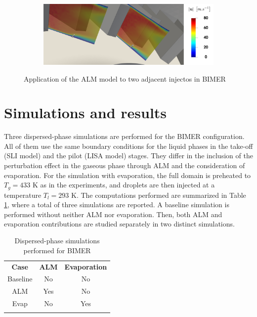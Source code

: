 \begin{figure}[ht]
\centering
\begin{subfigure}[b]{1.0\textwidth}
	\centering
   \includegraphics[scale=0.18]{./part3_applications/figures_ch9_lagrangian/turbulent_structures/ALM_revolution}
\end{subfigure}
   \caption{Application of the ALM model to two adjacent injectos in BIMER}
\label{fig:BIMER_ALM_revolution}
\end{figure}

\section{Simulations and results}

Three dispersed-phase simulations are performed for the BIMER configuration. All of them use the same boundary conditions for the liquid phases in the take-off (SLI model) and the pilot (LISA model) stages. They differ in the inclusion of the perturbation effect in the gaseous phase through ALM and the consideration of evaporation. For the simulation with evaporation, the full domain is preheated to $T_g = 433$ K as in the experiments, and droplets are then injected at a temperature $T_l = 293 $ K.  The computations performed are summarized in Table \ref{tab:BIMER_dispersed_phase_simulations_performed}, where a total of three simulations are reported. A baseline simulation is performed without neither ALM nor evaporation. Then, both ALM and evaporation contributions are studied separately in two distinct simulations.

\begin{table}[!h]
\centering
\caption{Dispersed-phase simulations performed for BIMER}
\begin{tabular}{ccc}
\thickhline
\textbf{Case} & \textbf{ALM} & \textbf{Evaporation} \\
\thickhline
Baseline & No & No \\
ALM & Yes & No \\
Evap & No & Yes \\%
\thickhline
\end{tabular}
\label{tab:BIMER_dispersed_phase_simulations_performed}
\end{table}


